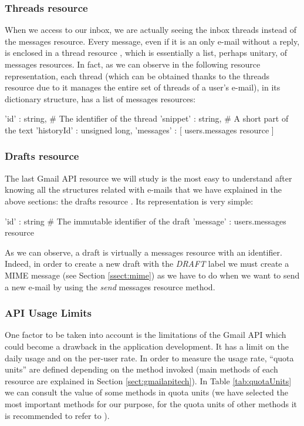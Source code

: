 \subsubsection{Threads resource}\label{sssect:threads}
When we access to our inbox, we are actually seeing the inbox threads instead of the messages resource. Every message, even if it is an only e-mail without a reply, is enclosed in a thread resource \citep[/v1/reference/users/threads]{gmailAPI}, which is essentially a list, perhaps unitary, of messages resources. In fact, as we can observe in the following resource representation, each thread (which can be obtained thanks to the threads resource due to it manages the entire set of threads of a user's e-mail), in its dictionary structure, has a list of messages resources:

\begin{python}
	{
		'id' : string, # The identifier of the thread
		'snippet' : string, # A short part of the text
		'historyId' : unsigned long,
		'messages' : [ users.messages resource ]
	}
\end{python}

\subsubsection{Drafts resource}\label{sssect:drafts}
The last Gmail API resource we will study is the most easy to understand after knowing all the structures related with e-mails that we have explained in the above sections: the drafts resource \citep[/v1/reference/users/drafts]{gmailAPI}. Its representation is very simple:

\begin{python}
	{
		'id' : string # The immutable identifier of the draft
		'message' : users.messages resource
	}
\end{python}

As we can observe, a draft is virtually a messages resource with an identifier. Indeed, in order to create a new draft with the \textit{DRAFT} label we must create a MIME message (see Section \ref{ssect:mime}) as we have to do when we want to send a new e-mail by using the \textit{send} messages resource method.

\subsubsection{API Usage Limits} \label{sssect:apilimits}
One factor to be taken into account is the limitations of the Gmail API \citep[/v1/reference/quota]{gmailAPI} which could become a drawback in the application development. It has a limit on the daily usage and on the per-user rate. In order to measure the usage rate, ``quota units'' are defined depending on the method invoked (main methods of each resource are explained in Section \ref{sect:gmailapitech}). In Table \ref{tab:quotaUnits} we can consult the value of some methods in quota units (we have selected the most important methods for our purpose, for the quota units of other methods it is recommended to refer to \cite[/v1/reference/quota]{gmailAPI}).

